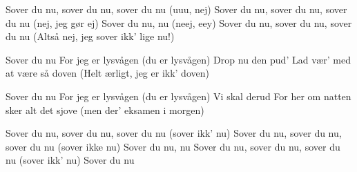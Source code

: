 \documentclass[a4paper,11pt]{article}
\begin{document}
\begin{song}
%
Sover du nu, sover du nu, sover du nu (uuu, nej)
Sover du nu, sover du nu, sover du nu (nej, jeg gør ej)
Sover du nu, nu (neej, eey)
Sover du nu, sover du nu, sover du nu (Altså nej, jeg sover ikk' lige nu!)

%
Sover du nu
For jeg er lysvågen (du er lysvågen)
Drop nu den pud’
Lad vær’ med at være så doven (Helt ærligt, jeg er ikk' doven) 

Sover du nu
For jeg er lysvågen (du er lysvågen)
Vi skal derud
For her om natten sker alt det sjove
(men der' eksamen i morgen)

%
Sover du nu, sover du nu, sover du nu (sover ikk' nu)
Sover du nu, sover du nu, sover du nu (sover ikke nu)
Sover du nu, nu 
Sover du nu, sover du nu, sover du nu (sover ikk' nu)
Sover du nu


\end{song}
\end{document}
